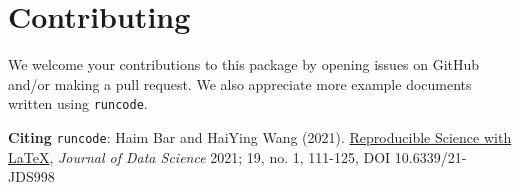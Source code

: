 \documentclass{ltxdoc}
\begin{document}
\section{Contributing}
\label{sec:org0730899}
We welcome your contributions to this package by opening issues on
GitHub and/or making a pull request. We also appreciate more example
documents written using \texttt{runcode}.


\textbf{Citing} \texttt{runcode}:
Haim Bar and HaiYing Wang (2021). \href{https://jds-online.org/journal/JDS/article/103/info}{Reproducible Science with \LaTeX{}},
\emph{Journal of Data Science} 2021; 19, no. 1, 111-125, DOI 10.6339/21-JDS998
\end{document}
